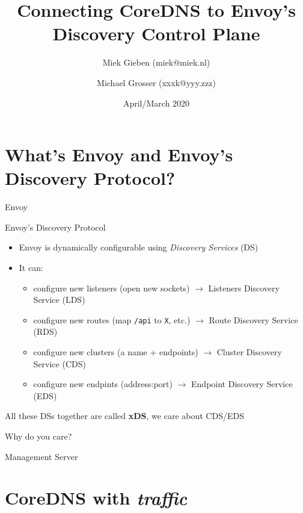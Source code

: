 \documentclass[aspectratio=169]{beamer}
\title{Connecting CoreDNS to Envoy's Discovery Control Plane}
\date{April/March 2020}
\author{Miek Gieben (miek@miek.nl) \and Michael Grosser (xxxk@yyy.zzz)}
\institute{Centre for protobuf Nerding}
\begin{document}
    \let\oldfootnotesize\footnotesize
    \renewcommand*{\footnotesize}{\oldfootnotesize\tiny}

    \maketitle

    \section{What's Envoy and Envoy's Discovery Protocol?}
    \begin{frame}{Envoy}

    \end{frame}

    \begin{frame}{Envoy's Discovery Protocol}
        \begin{itemize}
            \item Envoy is dynamically configurable using \emph{Discovery Services} (DS)
            \item It can:
            \begin{itemize}
                \item configure new listeners (open new sockets) $\rightarrow$ Listeners Discovery Service (LDS)
                \item configure new routes (map \texttt{/api} to \texttt{X}, etc.) $\rightarrow$ Route Discovery Service (RDS)
                \item configure new clusters (a name + endpoints) $\rightarrow$ Cluster Discovery Service (CDS)
                \item configure new endpints (address:port) $\rightarrow$ Endpoint Discovery Service (EDS)
            \end{itemize}
        \end{itemize}

        All these DSs together are called {\bf xDS}, we care about CDS/EDS
    \end{frame}

    \begin{frame}{Why do you care?}

    \end{frame}

    \begin{frame}{Management Server}

    \end{frame}

    \section{CoreDNS with \emph{traffic}}
\end{document}
